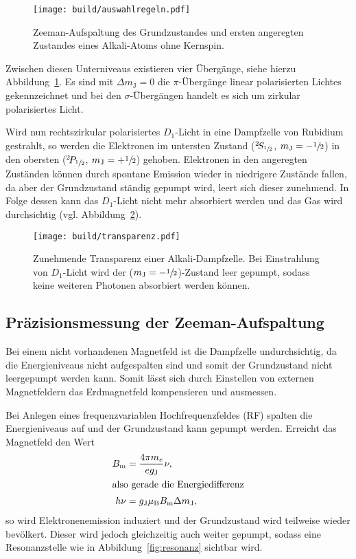 \begin{figure}[ht]
  \centering
  \texttt{[image: build/auswahlregeln.pdf]}
  \caption{%
    Zeeman-Aufspaltung des Grundzustandes und ersten angeregten
  Zustandes eines Alkali-Atoms ohne Kernspin.\cite{anleitung}
  }%
  \label{fig:auswahlregeln}
\end{figure}

Zwischen diesen Unterniveaus existieren vier Übergänge, siehe hierzu
Abbildung~\ref{fig:auswahlregeln}.
Es sind mit $\Delta m_\text{J} = 0$ die $\pi$-Übergänge linear polarisierten
Lichtes gekennzeichnet und bei den $\sigma$-Übergängen handelt es sich um
zirkular polarisiertes Licht.

Wird nun rechtszirkular polarisiertes $D_1$-Licht in eine Dampfzelle von Rubidium
gestrahlt, so werden die Elektronen im untersten Zustand
(${}^2\!S_{\sfrac{1}{2}}$, $m_\text{J} = - \sfrac{1}{2}$)
in den obersten
(${}^2\!P_{\sfrac{1}{2}}$, $m_\text{J} = + \sfrac{1}{2}$)
gehoben.
Elektronen in den angeregten Zuständen können durch spontane Emission wieder
in niedrigere Zustände fallen,
da aber der Grundzustand ständig gepumpt wird,
leert sich dieser zunehmend.
In Folge dessen kann das $D_1$-Licht nicht mehr absorbiert werden und das Gas
wird durchsichtig (vgl. Abbildung~\ref{fig:transparenz}).

\begin{figure}[ht]
  \centering
  \texttt{[image: build/transparenz.pdf]}
  \caption{%
    Zunehmende Transparenz einer Alkali-Dampfzelle.\cite{anleitung}
    Bei Einstrahlung von $D_1$-Licht wird der ($m_\text{J}
    = - \sfrac{1}{2}$)-Zustand leer gepumpt, sodass keine weiteren Photonen
    absorbiert werden können.
  }%
  \label{fig:transparenz}
\end{figure}




\subsection{Präzisionsmessung der Zeeman-Aufspaltung}%
\label{sub:prazisionsmessung_der_zeeman_aufspaltung}

Bei einem nicht vorhandenen Magnetfeld ist die Dampfzelle undurchsichtig,
da die Energieniveaus nicht aufgespalten sind und somit der Grundzustand nicht
leergepumpt werden kann.
Somit lässt sich durch Einstellen von externen Magnetfeldern das Erdmagnetfeld
kompensieren und ausmessen.

Bei Anlegen eines frequenzvariablen Hochfrequenzfeldes (RF) spalten die
Energieniveaus auf
und der Grundzustand kann gepumpt werden.
Erreicht das Magnetfeld den Wert
\begin{align}
	\label{eq:lande}
  B_\text{m} &= \frac{4 \pi m_e}{e g_\text{J}} \nu, \\
  \intertext{also gerade die Energiedifferenz}
  h \nu &= g_\text{J} \mu_\text{B} B_\text{m} \Delta m_\text{J},
\end{align}
so wird Elektronenemission induziert und der Grundzustand wird teilweise wieder
bevölkert.
Dieser wird jedoch gleichzeitig auch weiter gepumpt, sodass eine
Resonanzstelle wie in Abbildung~\ref{fig:resonanz} sichtbar wird.

